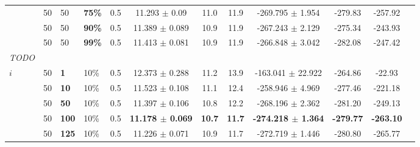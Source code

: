 \begin{sidewaystable}
\begin{tabular}{|l|l|l|l|l||c|c|c|c|c|c|c|}
    ~ & 50 & 50 & \textbf{75\%} & 0.5  & 11.293 $\pm$ 0.09 & 11.0 & 11.9 & -269.795 $\pm$ 1.954 & -279.83 & -257.92 \\
    ~ & 50 & 50 & \textbf{90\%} & 0.5  & 11.389 $\pm$ 0.089 & 10.9 & 11.9 & -267.243 $\pm$ 2.129 & -275.34 & -243.93 \\
    ~ & 50 & 50 & \textbf{99\%} & 0.5  & 11.413 $\pm$ 0.081 & 10.9 & 11.9 & -266.848 $\pm$ 3.042 & -282.08 & -247.42  \\
    \hline
    \emph{\color{blue}TODO} & & & & & &  &  & &  &   \\
    $i$ & 50 & \textbf{1} & 10\% & 0.5  & 12.373 $\pm$ 0.288 & 11.2 & 13.9& -163.041 $\pm$ 22.922 & -264.86 & -22.93  \\
    ~   & 50 &\textbf{10} & 10\% & 0.5  & 11.523 $\pm$ 0.108 & 11.1 & 12.4 & -258.946 $\pm$ 4.969 & -277.46& -221.18 \\
    ~   & 50 &\textbf{50} & 10\% & 0.5  & 11.397 $\pm$ 0.106 & 10.8 & 12.2 & -268.196 $\pm$ 2.362 & -281.20 & -249.13 \\
    ~   & 50 &\textbf{100} & 10\% & 0.5 & \textbf{11.178 $\pm$ 0.069} & \textbf{10.7} & \textbf{11.7} & \textbf{-274.218 $\pm$ 1.364} & \textbf{-279.77} & \textbf{-263.10} \\
    ~   & 50 &\textbf{125} & 10\% & 0.5 & 11.226 $\pm$ 0.071 & 10.9 & 11.7 & -272.719 $\pm$ 1.446 & -280.80 & -265.77  \\

\end{tabular}
\end{sidewaystable}
